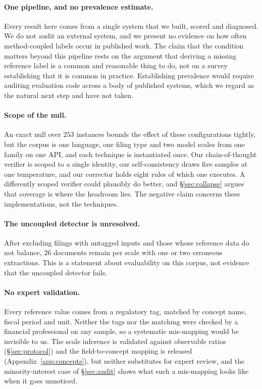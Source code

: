 \documentclass[11pt]{article}
\begin{document}
\paragraph{One pipeline, and no prevalence estimate.} Every result here comes from a
single system that we built, scored and diagnosed. We do not audit an external system,
and we present no evidence on how often method-coupled labels occur in published work.
The claim that the condition matters beyond this pipeline rests on the argument that
deriving a missing reference label is a common and reasonable thing to do, not on a
survey establishing that it is common in practice. Establishing prevalence would require
auditing evaluation code across a body of published systems, which we regard as the
natural next step and have not taken.

\paragraph{Scope of the null.} An exact null over $253$ instances bounds the effect of
these configurations tightly, but the corpus is one language, one filing type and two
model scales from one family on one API, and each technique is instantiated once. Our
chain-of-thought verifier is scoped to a single identity, our self-consistency draws
five samples at one temperature, and our corrector holds eight rules of which one
executes. A differently scoped verifier could plausibly do better, and
\S\ref{sec:collapse} argues that coverage is where the headroom lies. The negative
claim concerns these implementations, not the techniques.

\paragraph{The uncoupled detector is unresolved.} After excluding filings with untagged
inputs and those whose reference data do not balance, $26$ documents remain per scale
with one or two erroneous extractions. This is a statement about evaluability on this
corpus, not evidence that the uncoupled detector fails.

\paragraph{No expert validation.} Every reference value comes from a regulatory tag,
matched by concept name, fiscal period and unit. Neither the tags nor the matching were
checked by a financial professional on any sample, so a systematic mis-mapping would be
invisible to us. The scale inference is validated against observable ratios
(\S\ref{sec:protocol}) and the field-to-concept mapping is released
(Appendix~\ref{app:concepts}), but neither substitutes for expert review, and the
minority-interest case of \S\ref{sec:audit} shows what such a mis-mapping looks like
when it goes unnoticed.
\end{document}
